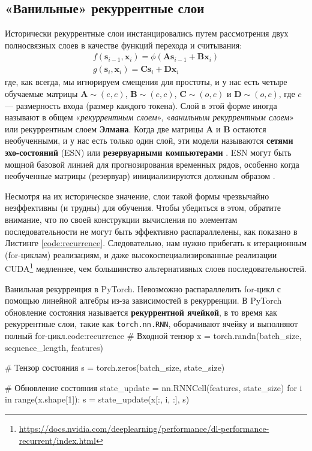 \vspace{-0.5em}
\subsection{«Ванильные» рекуррентные слои} \addclock

Исторически рекуррентные слои инстанцировались путем рассмотрения двух полносвязных слоев в качестве функций перехода и считывания:
%
\begin{gather}
f(\mathbf{s}_{i-1},\mathbf{x}_i)= \phi(\mathbf{A}\mathbf{s}_{i-1}+\mathbf{B}\mathbf{x}_i)\\g(\mathbf{s}_i,\mathbf{x}_i)=\mathbf{C}\mathbf{s}_i+\mathbf{D}\mathbf{x}_i
\end{gather}
%
где, как всегда, мы игнорируем смещения для простоты, и у нас есть четыре обучаемые матрицы $\mathbf{A} \sim (e,e)$, $\mathbf{B} \sim (e,c)$, $\mathbf{C} \sim (o,e)$ и $\mathbf{D} \sim (o,c)$, где $c$ — размерность входа (размер каждого токена). Слой в этой форме иногда называют в общем «\textit{рекуррентным слоем}», «\textit{ванильным рекуррентным слоем}» или рекуррентным слоем \textbf{Элмана}. Когда две матрицы $\mathbf{A}$ и $\mathbf{B}$ остаются необученными, и у нас есть только один слой, эти модели называются \textbf{сетями эхо-состояний} (ESN) или \textbf{резервуарными компьютерами} \cite{lukovsevivcius2009reservoir}. ESN могут быть мощной базовой линией для прогнозирования временных рядов, особенно когда необученные матрицы (резервуар) инициализируются должным образом \cite{gauthier2021next}.

Несмотря на их историческое значение, слои такой формы чрезвычайно неэффективны (и трудны) для обучения. Чтобы убедиться в этом, обратите внимание, что по своей конструкции вычисления по элементам последовательности не могут быть эффективно распараллелены, как показано в Листинге \ref{code:recurrence}. Следовательно, нам нужно прибегать к итерационным (for-циклам) реализациям, и даже высокоспециализированные реализации CUDA\footnote{\url{https://docs.nvidia.com/deeplearning/performance/dl-performance-recurrent/index.html}} медленнее, чем большинство альтернативных слоев последовательностей. 

\begin{mypy}{Ванильная рекурренция в PyTorch. Невозможно распараллелить for-цикл с помощью линейной алгебры из-за зависимостей в рекурренции. В PyTorch обновление состояния называется \textbf{рекуррентной ячейкой}, в то время как рекуррентные слои, такие как {\footnotesize\texttt{torch.nn.RNN}}, оборачивают ячейку и выполняют полный for-цикл.}{code:recurrence}
# Входной тензор
x = torch.randn(batch_size, sequence_length, features)

# Тензор состояния
s = torch.zeros(batch_size, state_size)

# Обновление состояния
state_update = nn.RNNCell(features, state_size)
for i in range(x.shape[1]):
  s = state_update(x[:, i, :], s)
\end{mypy}

